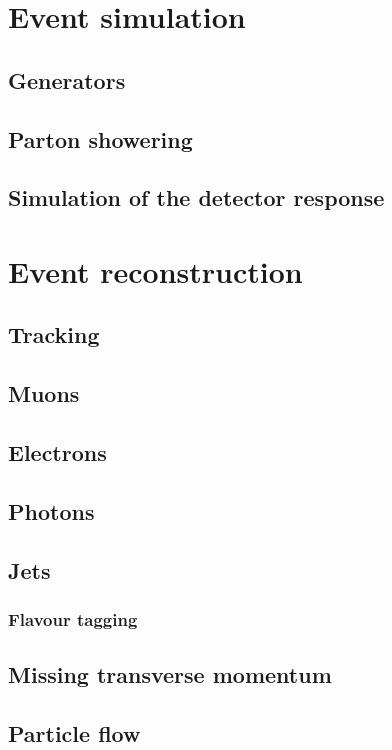 
\label{sec:RECO}
\minitoc
\section{Event simulation}
\subsection{Generators}
\subsection{Parton showering}
\subsection{Simulation of the detector response}

\section{Event reconstruction}
\subsection{Tracking}
\subsection{Muons}
\subsection{Electrons}
\subsection{Photons}
\subsection{Jets}
\subsubsection*{Flavour tagging}
\subsection{Missing transverse momentum}
\subsection{Particle flow}